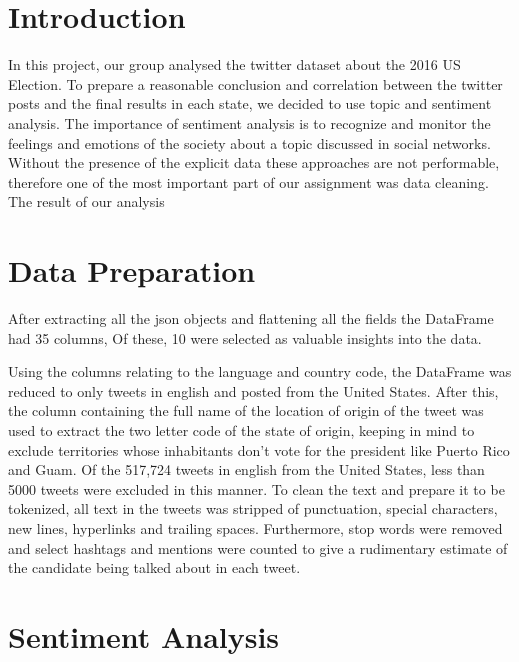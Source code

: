 \documentclass{article}
\begin{document}
  \setcounter{page}{1}
  \setcounter{section}{0}
  \setcounter{figure}{0}
  \section{Introduction}
  In this project, our group analysed the twitter dataset about the
  2016 US Election. To prepare a reasonable conclusion and correlation
  between the twitter posts and the final results in each state, we
  decided to use topic and sentiment analysis. The importance of
  sentiment analysis is to recognize and monitor the feelings and
  emotions of the society about a topic discussed in social
  networks. Without the presence of the explicit data these approaches
  are not performable, therefore one of the most important part of our
  assignment was data cleaning. The result of our analysis
  
  \section{Data Preparation}
  After extracting all the json objects and flattening all the fields
  the DataFrame had 35 columns, Of these, 10 were selected as valuable
  insights into the data.%
  
  Using the columns relating to the language and country code, the
  DataFrame was reduced to only tweets in english and posted from the
  United States. After this, the column containing the full name of
  the location of origin of the tweet was used to extract the two
  letter code of the state of origin, keeping in mind to exclude
  territories whose inhabitants don’t vote for the president like
  Puerto Rico and Guam. Of the 517,724 tweets in english from the
  United States, less than 5000 tweets were excluded in this
  manner. To clean the text and prepare it to be tokenized, all text
  in the tweets was stripped of punctuation, special characters, new
  lines, hyperlinks and trailing spaces. Furthermore, stop words were
  removed and select hashtags and mentions were counted to give a
  rudimentary estimate of the candidate being talked about in each
  tweet.
  
  \section{Sentiment Analysis}
\end{document}
